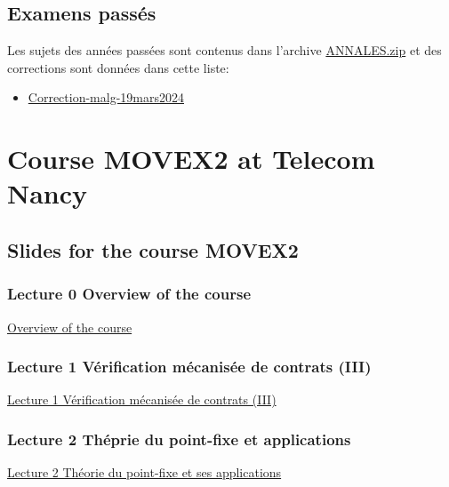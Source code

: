 \documentclass[ 12pt]{article}
\begin{document}
\subsection{Examens passés}
\label{sec:examens-passes}

Les sujets des années passées sont   contenus dans l'archive
\href{http://mery54.github.io/teaching/movex/lecturesnotes/ANNALES.zip}{ANNALES.zip}
et      des corrections sont données   dans cette liste:

\begin{itemize}
\item  \href{http://mery54.github.io/teaching/movex/lecturesnotes/Correction-malg-19mars2024.pdf}{Correction-malg-19mars2024}
\end{itemize}



\section{Course MOVEX2 at Telecom Nancy}
\label{sec:course-mcfsi-at}


\subsection{Slides for the course MOVEX2}
\label{sec:slides}


\subsubsection{Lecture 0  {Overview of the course }}
  
  \href{http://mery54.github.io/teaching/movex/lecturesnotes/movexlecture6.pdf}{Overview of the course }


   \subsubsection{Lecture 1 {Vérification  mécanisée de contrats} (III)}

   \href{http://mery54.github.io/teaching/movex/lecturesnotes/movexlecture7.pdf}{Lecture
     1  Vérification  mécanisée de contrats (III)}

   
   \subsubsection{Lecture 2 {Théprie du point-fixe et applications}}

   \href{http://mery54.github.io/teaching/movex/lecturesnotes/movexlecture2.pdf}{Lecture
     2  Théorie du point-fixe et ses applications}
   
\end{document}
